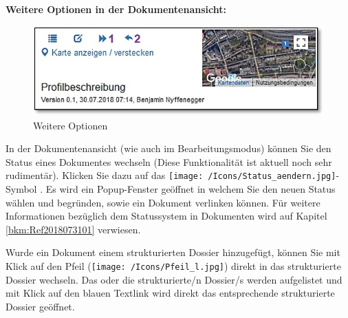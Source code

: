 \vspace{\baselineskip}

\textbf{Weitere Optionen in der Dokumentenansicht:}

\begin{figure} 
  \vspace{-25pt} 
  \begin{center}
    \includegraphics[width=1\linewidth]{../chapters/11_Dokumentenablage/pictures/dok_weitereOptionen.jpg}
  \end{center}
  \vspace{-20pt}
  \caption{Weitere Optionen}
  \vspace{-10pt}
\end{figure}

In der Dokumentenansicht (wie auch im Bearbeitungsmodus) können Sie den Status eines Dokumentes wechseln (Diese Funktionalität ist aktuell noch sehr rudimentär). Klicken Sie dazu auf das \texttt{[image: /Icons/Status\_aendern.jpg]}-Symbol . Es wird ein Popup-Fenster geöffnet in welchem Sie den neuen Status wählen und begründen, sowie ein Dokument verlinken können. Für weitere Informationen bezüglich dem Statussystem in Dokumenten wird auf Kapitel \ref{bkm:Ref2018073101} verwiesen.

\vspace{\baselineskip}

Wurde ein Dokument einem strukturierten Dossier hinzugefügt, können Sie mit Klick auf den Pfeil (\texttt{[image: /Icons/Pfeil\_l.jpg]})  direkt in das strukturierte Dossier wechseln. Das oder die strukturierte/n Dossier/s werden aufgelistet und mit Klick auf den blauen Textlink  wird direkt das entsprechende strukturierte Dossier geöffnet.

\begin{figure}[H]
\vspace{-15pt}
\end{figure}

